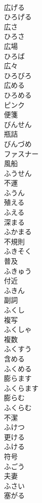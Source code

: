 \documentclass[8pt]{extreport}
\begin{document}
\begin{CJK}{UTF8}{min}
\\	広げる 
\\	ひろげる	
\\	広さ 
\\	ひろさ	
\\	広場 
\\	ひろば	
\\	広々 
\\	ひろびろ	
\\	広める 
\\	ひろめる	
\\	ピンク	
\\	便箋 
\\	びんせん	
\\	瓶詰 
\\	びんづめ	
\\	ファスナー	
\\	風船 
\\	ふうせん	
\\	不運 
\\	ふうん	
\\	殖える 
\\	ふえる	
\\	深まる 
\\	ふかまる	
\\	不規則 
\\	ふきそく	
\\	普及 
\\	ふきゅう	
\\	付近 
\\	ふきん	
\\	副詞 
\\	ふくし	
\\	複写 
\\	ふくしゃ	
\\	複数 
\\	ふくすう	
\\	含める 
\\	ふくめる	
\\	膨らます 
\\	ふくらます	
\\	膨らむ 
\\	ふくらむ	
\\	不潔 
\\	ふけつ	
\\	更ける 
\\	ふける	
\\	符号 
\\	ふごう	
\\	夫妻 
\\	ふさい	
\\	塞がる 

\end{CJK}
\end{document}
